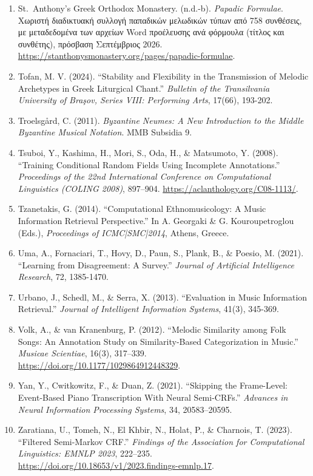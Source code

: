 \documentclass[11pt,a4paper]{article}
\begin{document}
\begin{enumerate}
\item
 St.~Anthony's Greek Orthodox Monastery. (n.d.-b). \emph{Papadic Formulae}. Χωριστή διαδικτυακή συλλογή παπαδικών μελωδικών τύπων από 758 συνθέσεις, με μεταδεδομένα των αρχείων Word προέλευσης ανά φόρμουλα (τίτλος και συνθέτης), πρόσβαση Σεπτέμβριος 2026. \url{https://stanthonysmonastery.org/pages/papadic-formulae}.
\item
 Tofan, M. V. (2024). ``Stability and Flexibility in the Transmission of Melodic Archetypes in Greek Liturgical Chant.'' \emph{Bulletin of the Transilvania University of Braşov, Series VIII: Performing Arts}, 17(66), 193-202.
\item
 Troelsgård, C. (2011). \emph{Byzantine Neumes: A New Introduction to the Middle Byzantine Musical Notation}. MMB Subsidia 9.
\item
 Tsuboi, Y., Kashima, H., Mori, S., Oda, H., \& Matsumoto, Y. (2008). ``Training Conditional Random Fields Using Incomplete Annotations.'' \emph{Proceedings of the 22nd International Conference on Computational Linguistics (COLING 2008)}, 897--904. \url{https://aclanthology.org/C08-1113/}.
\item
 Tzanetakis, G. (2014). ``Computational Ethnomusicology: A Music Information Retrieval Perspective.'' In A. Georgaki \& G. Kouroupetroglou (Eds.), \emph{Proceedings of ICMC|SMC|2014}, Athens, Greece.
\item
 Uma, A., Fornaciari, T., Hovy, D., Paun, S., Plank, B., \& Poesio, M. (2021). ``Learning from Disagreement: A Survey.'' \emph{Journal of Artificial Intelligence Research}, 72, 1385-1470.
\item
 Urbano, J., Schedl, M., \& Serra, X. (2013). ``Evaluation in Music Information Retrieval.'' \emph{Journal of Intelligent Information Systems}, 41(3), 345-369.
\item
 Volk, A., \& van Kranenburg, P. (2012). ``Melodic Similarity among Folk Songs: An Annotation Study on Similarity-Based Categorization in Music.'' \emph{Musicae Scientiae}, 16(3), 317--339. \url{https://doi.org/10.1177/1029864912448329}.
\item
 Yan, Y., Cwitkowitz, F., \& Duan, Z. (2021). ``Skipping the Frame-Level: Event-Based Piano Transcription With Neural Semi-CRFs.'' \emph{Advances in Neural Information Processing Systems}, 34, 20583--20595.
\item
 Zaratiana, U., Tomeh, N., El Khbir, N., Holat, P., \& Charnois, T. (2023). ``Filtered Semi-Markov CRF.'' \emph{Findings of the Association for Computational Linguistics: EMNLP 2023}, 222--235. \url{https://doi.org/10.18653/v1/2023.findings-emnlp.17}.
\end{enumerate}


\endgroup
\end{document}
